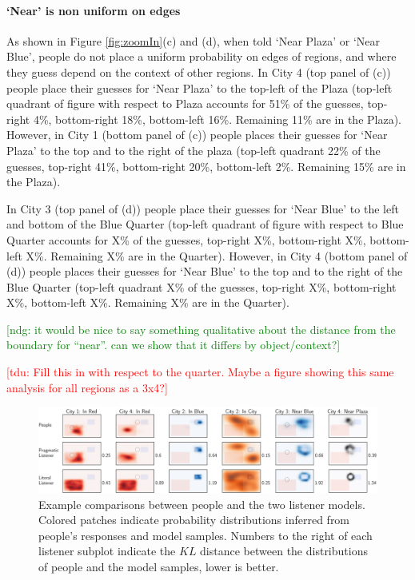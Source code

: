 \documentclass[10pt,letterpaper]{article}
\newcommand{\ndg}[1]{\textcolor{Green}{[ndg: #1]}}
\newcommand{\tdu}[1]{\textcolor{Red}{[tdu: #1]}}
\begin{document}
\paragraph{`Near' is non uniform on edges} As shown in Figure \ref{fig:zoomIn}(c) and (d), when told `Near Plaza' or `Near Blue', people do not place a uniform probability on edges of regions, and where they guess depend on the context of other regions. In City 4 (top panel of (c)) people place their guesses for `Near Plaza' to the top-left of the Plaza (top-left quadrant of figure with respect to Plaza accounts for 51\% of the guesses, top-right 4\%, bottom-right 18\%, bottom-left 16\%. Remaining 11\% are in the Plaza). However, in City 1 (bottom panel of (c)) people places their guesses for `Near Plaza' to the top and to the right of the plaza (top-left quadrant 22\% of the guesses, top-right 41\%, bottom-right 20\%, bottom-left 2\%. Remaining 15\% are in the Plaza). %

In City 3 (top panel of (d)) people place their guesses for `Near Blue' to the left and bottom of the Blue Quarter (top-left quadrant of figure with respect to Blue Quarter accounts for X\% of the guesses, top-right X\%, bottom-right X\%, bottom-left X\%. Remaining X\% are in the Quarter). However, in City 4 (bottom panel of (d)) people places their guesses for `Near Blue' to the top and to the right of the Blue Quarter (top-left quadrant X\% of the guesses, top-right X\%, bottom-right X\%, bottom-left X\%. Remaining X\% are in the Quarter). 

\ndg{it would be nice to say something qualitative about the distance from the boundary for ``near''. can we show that it differs by object/context?}

\tdu{Fill this in with respect to the quarter. Maybe a figure showing this same analysis for all regions as a 3x4?}

\begin{figure}[!t]
\center
\includegraphics[width=\textwidth]{figures/Figure4.pdf}
\caption{Example comparisons between people and the two listener models. Colored patches indicate probability distributions inferred from people's responses and model samples. Numbers to the right of each listener subplot indicate the $KL$ distance between the distributions of people and the model samples, lower is better.}
\label{fig:modelExamples}
\end{figure}
\end{document}
